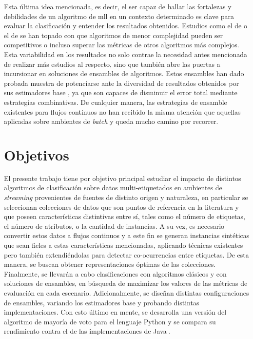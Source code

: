 Esta última idea mencionada, es decir, el ser capaz de hallar las fortalezas y
debilidades de un algoritmo de \acrshort{mll} en un contexto determinado es
clave para evaluar la clasificación y entender los resultados obtenidos.
Estudios como el de \citeauthor{sousa_multi-label_2018}
\cite{sousa_multi-label_2018} o el de \citeauthor{read_scalable_2012}
\cite{read_scalable_2012} se han topado con que algoritmos de menor complejidad
pueden ser competitivos o incluso superar las métricas de otros algoritmos más
complejos. Esta variabilidad en los resultados no solo contrae la necesidad
antes mencionada de realizar más estudios al respecto, sino que también abre las
puertas a incursionar en soluciones de ensambles de algoritmos. Estos ensambles
han dado probada muestra de potenciarse ante la diversidad de resultados
obtenidos por sus estimadores base \cite{polikar_polikar_2006}, ya que son
capaces de disminuir el error total mediante estrategias combinativas. De
cualquier manera, las estrategias de ensamble existentes para flujos continuos
no han recibido la misma atención que aquellas aplicadas sobre ambientes de
\textit{batch} y queda mucho camino por recorrer.



\section{Objetivos}

El presente trabajo tiene por objetivo principal estudiar el impacto de
distintos algoritmos de clasificación sobre datos multi-etiquetados en ambientes
de \textit{streaming} provenientes de fuentes de distinto origen y naturaleza,
en particular se seleccionan colecciones de datos que son puntos de referencia
en la literatura y que poseen características distintivas entre sí, tales como
el número de etiquetas, el número de atributos, o la cantidad de instancias. A
su vez, es necesario convertir estos datos a flujos continuos y a este fin se
generan instancias sintéticas que sean fieles a estas características
mencionadas, aplicando técnicas existentes pero también extendiéndolas para
detectar co-ocurrencias entre etiquetas. De esta manera, se buscan obtener
representaciones óptimas de las colecciones. Finalmente, se llevarán a cabo
clasificaciones con algoritmos clásicos y con soluciones de ensambles, en
búsqueda de maximizar los valores de las métricas de evaluación en cada
escenario. Adicionalmente, se diseñan distintas configuraciones de ensambles,
variando los estimadores base y probando distintas implementaciones. Con esto
último en mente, se desarrolla una versión del algoritmo de mayoría de voto
 para el lenguaje
Python  y se compara su rendimiento contra el de
las implementaciones de Java .


